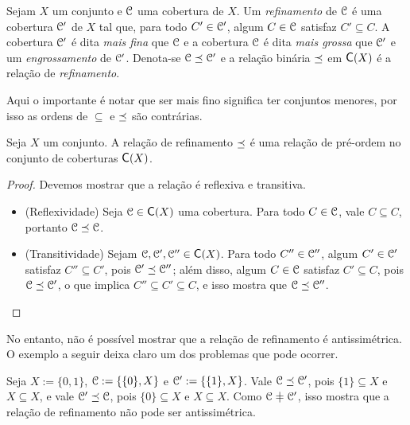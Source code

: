\begin{definition}[Refinamento]
Sejam $X$ um conjunto e $\mathcal{C}$ uma cobertura de $X$. Um \emph{refinamento} de $\mathcal{C}$ é uma cobertura $\mathcal{C}'$ de $X$ tal que, para todo $C' \in \mathcal{C}'$, algum $C \in \mathcal{C}$ satisfaz $C' \subseteq C$. A cobertura $\mathcal{C}'$ é dita \emph{mais fina} que $\mathcal{C}$ e a cobertura $\mathcal{C}$ é dita \emph{mais grossa} que $\mathcal{C}'$ e um \emph{engrossamento} de $\mathcal{C}'$. Denota-se $\mathcal{C} \preceq \mathcal{C}'$ e a relação binária $\preceq$ em $\Cober(X)$ é a relação de \emph{refinamento}.
\end{definition}

Aqui o importante é notar que ser mais fino significa ter conjuntos menores, por isso as ordens de $\subseteq$ e $\preceq$ são contrárias.

\begin{proposition}
\label{prop:refinamento.preordem}
Seja $X$ um conjunto. A relação de refinamento $\preceq$ é uma relação de pré-ordem no conjunto de coberturas $\Cober(X)$.
\end{proposition}
\begin{proof}
Devemos mostrar que a relação é reflexiva e transitiva.
	\begin{itemize}
	\item (Reflexividade) Seja $\cober \in \Cober(X)$ uma cobertura. Para todo $C \in \mathcal{C}$, vale $C \subseteq C$, portanto $\mathcal{C} \preceq \mathcal{C}$.
	
	\item (Transitividade) Sejam $\cober, \cober', \cober'' \in \Cober(X)$. Para todo $C'' \in \mathcal{C}''$, algum $C' \in \mathcal{C}'$ satisfaz $C'' \subseteq C'$, pois $\mathcal{C}' \preceq \mathcal{C}''$; além disso, algum $C \in \mathcal{C}$ satisfaz $C' \subseteq C$, pois $\mathcal{C} \preceq \mathcal{C}'$, o que implica $C'' \subseteq C' \subseteq C$, e isso mostra que $\mathcal{C} \preceq \mathcal{C}''$.
	\qedhere
	\end{itemize}
\end{proof}

No entanto, não é possível mostrar que a relação de refinamento é antissimétrica. O exemplo a seguir deixa claro um dos problemas que pode ocorrer.

\begin{example}
Seja $X := \{0, 1\}$, $\mathcal{C} := \{\{0\}, X\}$ e $\mathcal{C}' := \{\{1\}, X\}$. Vale $\mathcal{C} \preceq \mathcal{C}'$, pois $\{1\} \subseteq X$ e $X \subseteq X$, e vale $\mathcal{C}' \preceq \mathcal{C}$, pois $\{0\} \subseteq X$ e $X \subseteq X$. Como $\cober \neq \cober'$, isso mostra que a relação de refinamento não pode ser antissimétrica.
\end{example}

